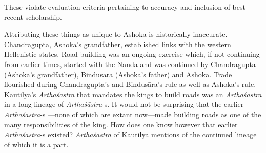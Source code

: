 These violate evaluation criteria pertaining to accuracy and inclusion of best recent scholarship. 

Attributing these things as unique to Ashoka is historically inaccurate. Chandragupta, Ashoka's grandfather, established links with the western Hellenistic states. Road building was an ongoing exercise which, if not continuing from earlier times, started with the Nanda and was continued by Chandragupta (Ashoka’s grandfather), Bindusāra (Ashoka's father) and Ashoka. Trade flourished during Chandragupta's and Bindusāra's rule as well as Ashoka's rule. Kautilya’s \textit{Arthaśāstra} that mandates the kings to build roads was an \textit{Arthaśāstra} in a long lineage of \textit{Arthaśāstra}-s. It would not be surprising that the earlier \textit{Arthaśāstra}-s —none of which are extant now—made building roads as one of the many responsibilities of the king. How does one know however that earlier \textit{Arthaśāstra}-s existed? \textit{Arthaśāstra} of Kautilya mentions of the continued lineage of which it is a part.
